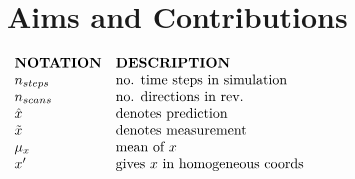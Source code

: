 \chapter*{Aims and Contributions}

$
\begin{array}{ll}
	\textbf{NOTATION} 	& \textbf{DESCRIPTION}\\
	n_{steps}			& \textnormal{no. time steps in simulation}\\
	n_{scans}			& \textnormal{no. directions in rev.}\\
	\hat{x}	 			& \textnormal{denotes prediction}\\
	\tilde{x}	 		& \textnormal{denotes measurement}\\
	\mu_x		 		& \textnormal{mean of } x\\
	x'					& \textnormal{gives } x \textnormal{ in homogeneous coords}
\end{array}
$